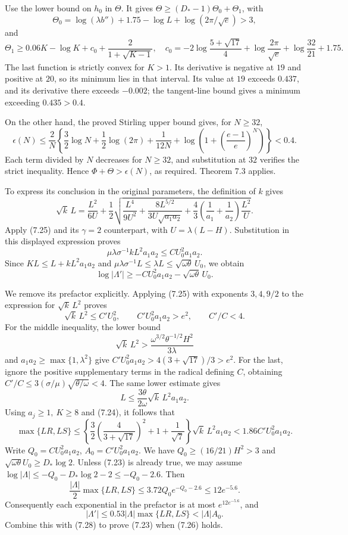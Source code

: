 \documentclass[
  11pt,
  a4paper,
]{article}
\begin{document}
Use the lower bound on \(h_0\) in \(\Theta\). It gives
\(\Theta\ge(D_*-1)\Theta_0+\Theta_1\), with \[
\Theta_0=\log(\lambda b'')+1.75-\log L+\log(2\pi/\sqrt e)>3,
\] and \[
\Theta_1\ge0.06K-\log K+c_0+\frac2{1+\sqrt{K-1}},
\quad
c_0=-2\log\frac{5+\sqrt{17}}4+\log\frac{2\pi}{\sqrt e}
+\log\frac{32}{21}+1.75.
\] The last function is strictly convex for \(K>1\). Its derivative is
negative at \(19\) and positive at \(20\), so its minimum lies in that
interval. Its value at \(19\) exceeds \(0.437\), and its derivative
there exceeds \(-0.002\); the tangent-line bound gives a minimum
exceeding \(0.435>0.4\).

On the other hand, the proved Stirling upper bound gives, for
\(N\ge32\), \[
\epsilon(N)\le\frac2N\left\{\frac32\log N+
\frac12\log(2\pi)+\frac1{12N}
+\log\left(1+\left(\frac{e-1}{e}\right)^N\right)\right\}<0.4.
\] Each term divided by \(N\) decreases for \(N\ge32\), and substitution
at \(32\) verifies the strict inequality. Hence
\(\Phi+\Theta>\epsilon(N)\), as required. Theorem 7.3 applies.

To express its conclusion in the original parameters, the definition of
\(k\) gives \[
\sqrt k\,L=
\frac{L^2}{6U}+\frac12\sqrt{
\frac{L^4}{9U^2}+
\frac{8L^{5/2}}{3U\sqrt{a_1a_2}}
+\frac43\left(\frac1{a_1}+\frac1{a_2}\right)\frac{L^2}{U}}.
\] Apply (7.25) and its \(\gamma=2\) counterpart, with
\(U=\lambda(L-H)\). Substitution in this displayed expression proves \[
\mu\lambda\sigma^{-1}kL^2a_1a_2\le CU_0^2a_1a_2.
\] Since \(KL\le L+kL^2a_1a_2\) and
\(\mu\lambda\sigma^{-1}L\le\lambda L\le\sqrt{\omega\theta}\,U_0\), we
obtain \[
\log|\Lambda'|\ge-CU_0^2a_1a_2-\sqrt{\omega\theta}\,U_0. \tag{7.28}
\]

We remove its prefactor explicitly. Applying (7.25) with exponents
\(3,4,9/2\) to the expression for \(\sqrt k\,L^2\) proves \[
\sqrt k\,L^2\le C'U_0^2,\qquad
C'U_0^2a_1a_2>e^2,\qquad C'/C<4.
\] For the middle inequality, the lower bound \[
\sqrt k\,L^2>
\frac{\omega^{3/2}\theta^{-1/2}H^2}{3\lambda}
\] and \(a_1a_2\ge\max\{1,\lambda^2\}\) give
\(C'U_0^2a_1a_2>4(3+\sqrt{17})/3>e^2\). For the last, ignore the
positive supplementary terms in the radical defining \(C\), obtaining
\(C'/C\le3(\sigma/\mu)\sqrt{\theta/\omega}<4\). The same lower estimate
gives \[
L\le\frac{3\theta}{2\omega}\sqrt k\,L^2a_1a_2.
\] Using \(a_j\ge1,\ K\ge8\) and (7.24), it follows that \[
\max\{LR,LS\}\le
\left\{\frac32\left(\frac4{3+\sqrt{17}}\right)^2
+1+\frac1{\sqrt7}\right\}\sqrt k\,L^2a_1a_2
<1.86C'U_0^2a_1a_2.
\] Write \(Q_0=CU_0^2a_1a_2\), \(A_0=C'U_0^2a_1a_2\). We have
\(Q_0\ge(16/21)H^2>3\) and \(\sqrt{\omega\theta}U_0\ge D_*\log2\).
Unless (7.23) is already true, we may assume
\(\log|\Lambda|\le-Q_0-D_*\log2-2\le-Q_0-2.6\). Then \[
\frac{|\Lambda|}{2}\max\{LR,LS\}
\le3.72Q_0e^{-Q_0-2.6}\le12e^{-5.6}.
\] Consequently each exponential in the prefactor is at most
\(e^{12e^{-5.6}}\), and \[
|\Lambda'|\le0.53|\Lambda|\max\{LR,LS\}
<|\Lambda|A_0.
\] Combine this with (7.28) to prove (7.23) when (7.26) holds.
\end{document}
